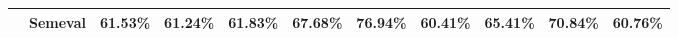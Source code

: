 \begin{tabular}{llrrrrrrrrr}
            & Semeval               &                               61.53\% &                              61.24\% &                              61.83\% &                               67.68\% &                              76.94\% &                              60.41\% &                     65.41\% &                    70.84\% &                    60.76\% \\
\hline
\end{tabular}